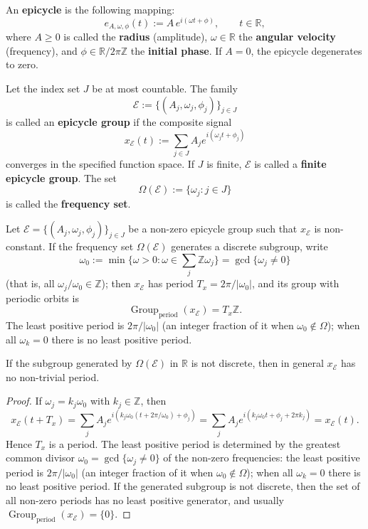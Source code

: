 \begin{definition}\label{def:epicycle}
An \textbf{epicycle} is the following mapping:
\[
e_{A,\omega,\phi}(t):=A\,e^{i(\omega t+\phi)},\qquad t\in\mathbb{R},
\]
where $A\ge0$ is called the \textbf{radius} (amplitude), $\omega\in\mathbb{R}$ the \textbf{angular velocity} (frequency), and $\phi\in\mathbb{R}/2\pi\mathbb{Z}$ the \textbf{initial phase}. If $A=0$, the epicycle degenerates to zero.
\end{definition}

\begin{definition}\label{def:epicycle_system}
Let the index set $J$ be at most countable. The family
\[
\mathcal{E}:=\{(A_j,\omega_j,\phi_j)\}_{j\in J}
\]
is called an \textbf{epicycle group} if the composite signal
\[
x_{\mathcal{E}}(t):=\sum_{j\in J}A_j e^{i(\omega_j t+\phi_j)}
\]
converges in the specified function space. If $J$ is finite, $\mathcal{E}$ is called a \textbf{finite epicycle group}. The set
\[
\Omega(\mathcal{E}):=\{\omega_j:j\in J\}
\]
is called the \textbf{frequency set}.
\end{definition}

\begin{proposition}\label{prop:epicycle_group_with_periodic_orbits}
Let $\mathcal{E}=\{(A_j,\omega_j,\phi_j)\}_{j\in J}$ be a non-zero epicycle group such that $x_{\mathcal{E}}$ is non-constant. If the frequency set $\Omega(\mathcal{E})$ generates a discrete subgroup, write
\[
\omega_0:=\min\{\omega>0:\omega\in\textstyle\sum_j\mathbb{Z}\omega_j\}=\gcd\{\omega_j\ne0\}
\]
(that is, all $\omega_j/\omega_0\in\mathbb{Z}$); then $x_{\mathcal{E}}$ has period $T_x=2\pi/\lvert\omega_0\rvert$, and its group with periodic orbits is
\[
\operatorname{Group}_{\mathrm{period}}(x_{\mathcal{E}})=T_x\mathbb{Z}.
\]
The least positive period is $2\pi/\lvert\omega_0\rvert$ (an integer fraction of it when $\omega_0\notin\Omega$); when all $\omega_k=0$ there is no least positive period.

If the subgroup generated by $\Omega(\mathcal{E})$ in $\mathbb{R}$ is not discrete, then in general $x_{\mathcal{E}}$ has no non-trivial period.
\end{proposition}

\begin{proof}
If $\omega_j=k_j\omega_0$ with $k_j\in\mathbb{Z}$, then
\[
x_{\mathcal{E}}(t+T_x)=\sum_j A_j e^{i(k_j\omega_0(t+2\pi/\omega_0)+\phi_j)}
=\sum_j A_j e^{i(k_j\omega_0 t+\phi_j+2\pi k_j)}
=x_{\mathcal{E}}(t).
\]
Hence $T_x$ is a period. The least positive period is determined by the greatest common divisor $\omega_0=\gcd\{\omega_j\ne0\}$ of the non-zero frequencies: the least positive period is $2\pi/\lvert\omega_0\rvert$ (an integer fraction of it when $\omega_0\notin\Omega$); when all $\omega_k=0$ there is no least positive period. If the generated subgroup is not discrete, then the set of all non-zero periods has no least positive generator, and usually $\operatorname{Group}_{\mathrm{period}}(x_{\mathcal{E}})=\{0\}$.
\end{proof}

